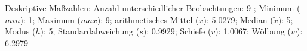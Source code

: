 				\label{tableValues:bsch14b}
				\vspace*{-\baselineskip}
                    \begin{noten}
                	    \note{} Deskriptive Maßzahlen:
                	    Anzahl unterschiedlicher Beobachtungen: 9%
                	    ; 
                	      Minimum ($min$): 1; 
                	      Maximum ($max$): 9; 
                	      arithmetisches Mittel ($\bar{x}$): \num[round-mode=places,round-precision=2]{5.0279}; 
                	      Median ($\tilde{x}$): 5; 
                	      Modus ($h$): 5; 
                	      Standardabweichung ($s$): \num[round-mode=places,round-precision=2]{0.9929}; 
                	      Schiefe ($v$): \num[round-mode=places,round-precision=2]{1.0067}; 
                	      Wölbung ($w$): \num[round-mode=places,round-precision=2]{6.2979}
                     \end{noten}

